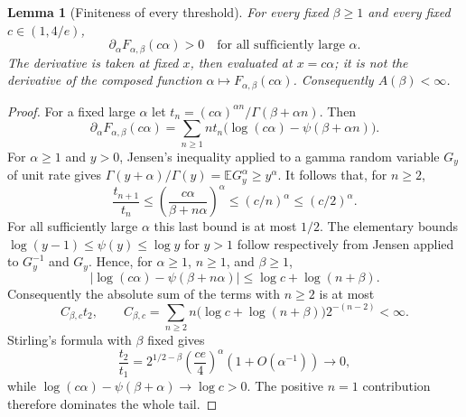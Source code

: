 \documentclass[11pt,a4paper]{article}
\theoremstyle{plain}
\newtheorem{lemma}[theorem]{Lemma}
\theoremstyle{remark}
\begin{document}
\begin{lemma}[Finiteness of every threshold]\label{lem:beta-finite}
For every fixed $\beta\geq1$ and every fixed $c\in(1,4/e)$,
\[
 \partial_\alpha F_{\alpha,\beta}(c\alpha)>0
 \quad\text{for all sufficiently large }\alpha.
\]
The derivative is taken at fixed $x$, then evaluated at $x=c\alpha$;
it is not the derivative of the composed function
$\alpha\mapsto F_{\alpha,\beta}(c\alpha)$.
Consequently $A(\beta)<\infty$.
\end{lemma}
\begin{proof}
For a fixed large $\alpha$ let
$t_n=(c\alpha)^{\alpha n}/\Gamma(\beta+\alpha n)$.
Then
\[
 \partial_\alpha F_{\alpha,\beta}(c\alpha)
 =\sum_{n\geq1}n t_n
        \bigl(\log(c\alpha)-\psi(\beta+\alpha n)\bigr).
\]
For $\alpha\geq1$ and $y>0$, Jensen's inequality applied to a gamma random
variable $G_y$ of unit rate gives
$\Gamma(y+\alpha)/\Gamma(y)=\mathbb E G_y^\alpha\geq y^\alpha$.
It follows that, for $n\geq2$,
\[
 \frac{t_{n+1}}{t_n}\leq
 \left(\frac{c\alpha}{\beta+n\alpha}\right)^\alpha
 \leq(c/n)^\alpha\leq(c/2)^\alpha.
\]
For all sufficiently large $\alpha$ this last bound is at most $1/2$.
The elementary bounds
$\log(y-1)\leq\psi(y)\leq\log y$ for $y>1$ follow respectively
from Jensen applied to $G_y^{-1}$ and $G_y$.
Hence, for $\alpha\geq1$, $n\geq1$, and $\beta\geq1$,
\[
 \bigl|\log(c\alpha)-\psi(\beta+n\alpha)\bigr|
 \leq\log c+\log(n+\beta).
\]
Consequently the absolute sum of the terms with $n\geq2$ is at most
\[
 C_{\beta,c}t_2,\qquad
 C_{\beta,c}=\sum_{n\geq2}n\bigl(\log c+\log(n+\beta)\bigr)2^{-(n-2)}<\infty.
\]
Stirling's formula with $\beta$ fixed gives
\[
 \frac{t_2}{t_1}
  =2^{1/2-\beta}\left(\frac{ce}{4}\right)^\alpha(1+O(\alpha^{-1}))
  \longrightarrow0,
\]
while $\log(c\alpha)-\psi(\beta+\alpha)\to\log c>0$.
The positive $n=1$ contribution therefore dominates the whole tail.
\end{proof}
\end{document}
